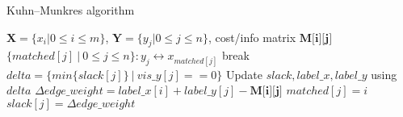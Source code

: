 \documentclass{article}
\begin{document}

\begin{algorithm}
    \caption{Kuhn–Munkres algorithm}
    \label{alg:1}
    \begin{algorithmic}[1]
        \Require $\textbf{X}=\{x_{i}|0\leq i \leq m\}$, $\textbf{Y}=\{y_{j}|0\leq j \leq n\}$, cost/info matrix $\textbf{M[i][j]}$
        \Ensure $\{matched[j]\ |\ 0\leq j \leq n\}:y_{j}\leftrightarrow x_{matched[j]}$
					\State break
				\Else
					\State $delta = \{min\{slack[j]\}\ |\ vis\_y[j]==0\}$
					\State Update $slack, label\_x, label\_y$ using $delta$
				\EndIf
			\EndWhile
			\EndFor
			\State {}
        \EndFunction
        \State
			\State $\Delta edge\_weight = label\_x[i]+label\_y[j]-\textbf{M[i][j]}$
					\State $matched[j] = i$
					\State {}
				\EndIf
				\State $slack[j] = \Delta edge\_weight$
			\EndIf
			\EndFor
			
			\State {}
        \EndFunction
    \end{algorithmic}
\end{algorithm}
\end{document}
